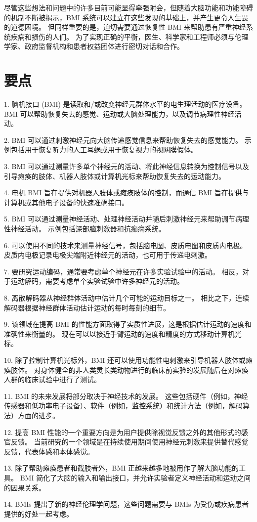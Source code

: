 尽管这些想法和问题中的许多目前可能显得牵强附会，但随着大脑功能和功能障碍的机制不断被揭示，BMI 系统可以建立在这些发现的基础上，并产生更令人生畏的道德困境。 
但同样重要的是，迫切需要通过恢复性 BMI 来帮助患有严重神经系统疾病和损伤的人们。 
为了实现正确的平衡，医生、科学家和工程师必须与伦理学家、政府监督机构和患者权益团体进行密切对话和合作。


\section{要点}

1. 脑机接口 (BMI) 是读取和/或改变神经元群体水平的电生理活动的医疗设备。 BMI 可以帮助恢复失去的感觉、运动或大脑处理能力，以及调节病理性神经活动。 

2. BMI 可以通过刺激神经元向大脑传递感觉信息来帮助恢复失去的感觉能力。 示例包括用于恢复听力的人工耳蜗或用于恢复视力的视网膜假体。 

3. BMI 可以通过测量许多单个神经元的活动、将此神经信息转换为控制信号以及引导瘫痪的肢体、机器人肢体或计算机光标来帮助恢复失去的运动能力。 

4. 电机 BMI 旨在提供对机器人肢体或瘫痪肢体的控制，而通信 BMI 旨在提供与计算机或其他电子设备的快速准确接口。

5. BMI 可以通过测量神经活动、处理神经活动并随后刺激神经元来帮助调节病理性神经活动。 示例包括深部脑刺激器和抗癫痫系统。 

6. 可以使用不同的技术来测量神经信号，包括脑电图、皮质电图和皮质内电极。 皮质内电极记录电极尖端附近神经元的活动，也可用于传递电刺激。 

7. 要研究运动编码，通常要考虑单个神经元在许多实验试验中的活动。 相反，对于运动解码，需要考虑单个实验试验中许多神经元的活动。 

8. 离散解码器从神经群体活动中估计几个可能的运动目标之一。 相比之下，连续解码器根据神经群体活动估计运动的每时每刻的细节。 

9. 该领域在提高 BMI 的性能方面取得了实质性进展，这是根据估计运动的速度和准确性来衡量的。 现在可以以接近手臂运动的速度和精度的方式移动计算机光标。 

10. 除了控制计算机光标外，BMI 还可以使用功能性电刺激来引导机器人肢体或瘫痪肢体。 对身体健全的非人类灵长类动物进行的临床前实验的发展随后在对瘫痪人群的临床试验中进行了测试。 

11. BMI 的未来发展将部分取决于神经技术的发展。 这些包括硬件（例如，神经传感器和低功率电子设备）、软件（例如，监控系统）和统计方法（例如，解码算法）方面的进步。 

12. 提高 BMI 性能的一个重要方向是为用户提供除视觉反馈之外的其他形式的感官反馈。 当前研究的一个领域是在持续使用期间使用神经元刺激来提供替代感觉反馈，代表体感和本体感觉。 

13. 除了帮助瘫痪患者和截肢者外，BMI 正越来越多地被用作了解大脑功能的工具。 BMI 简化了大脑的输入和输出接口，并允许实验者定义神经活动和运动之间的因果关系。 

14. BMIs 提出了新的神经伦理学问题，这些问题需要与 BMIs 为受伤或疾病患者提供的好处一起考虑。


